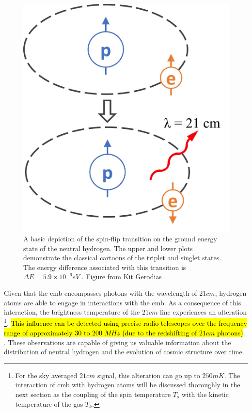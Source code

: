 \documentclass[12pt, TexShade, letterpaper]{report}
\begin{document}
\begin{figure}[h!]
\centering
\includegraphics[scale =0.4]{spinflip.jpg}
\caption[Spin-flip Transition of Neutral Hydrogen]{A basic depiction of the spin-flip transition on the ground energy state of the neutral hydrogen. The upper and lower plots demonstrate the classical cartoons of the triplet and singlet states. The energy difference associated with this transition is $\Delta E = 5.9 \times 10 ^{-6}eV$ \cite{21century}. Figure from Kit Gerodias \cite{kit_thesis}.}
\label{fig:spinflip}
\end{figure}

Given that the \gls{cmb} encompasses photons with the wavelength of $21cm$, hydrogen atoms are able to engage in interactions with the \gls{cmb}. As a consequence of this interaction, the brightness temperature of the $21cm$ line experiences an alteration \footnote{For the sky averaged $21cm$ signal, this alteration can go up to $250mK$. The interaction of \gls{cmb} with hydrogen atoms will be discussed thoroughly in the next section as the coupling of the spin temperature $T_s$ with the kinetic temperature of the gas $T_k$.}. \hl{This influence can be detected using precise radio telescopes over the frequency range of approximately 30 to 200 $MHz$ (due to the redshifting of $21cm$ photons)}. \cite{low_frequency}. These observations are capable of giving us valuable information about the distribution of neutral hydrogen and the evolution of cosmic structure over time\cite{low_frequency}.\par
\end{document}
